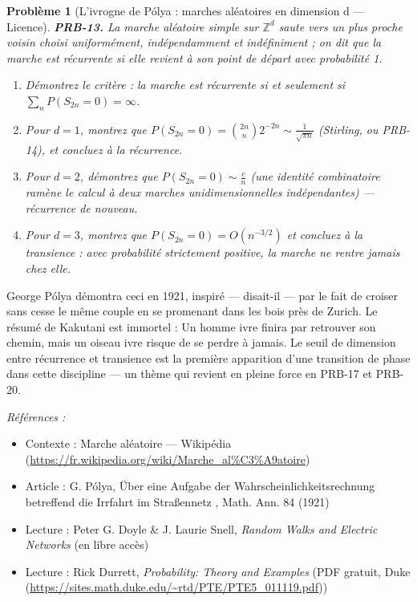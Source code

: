 \documentclass[11pt]{article}
\newtheorem{problem}{Problème}
\newenvironment{refs}{\par\small\noindent\emph{Références :}\begin{itemize}\setlength\itemsep{0pt}}{\end{itemize}\normalsize}
\begin{document}
\bigskip

\begin{problem}[{L'ivrogne de Pólya : marches aléatoires en dimension d --- Licence}]
\textbf{PRB-13.} La marche aléatoire simple sur $ \mathbb{Z}^d $ saute
vers un plus proche voisin choisi uniformément, indépendamment et indéfiniment ; on dit que la
marche est \textit{récurrente} si elle revient à son point de départ avec probabilité 1.
\begin{enumerate}
\item[(i)] Démontrez le critère : la marche est récurrente si et seulement si
$ \sum_n P(S_{2n} = 0) = \infty $.
\item[(ii)] Pour $ d=1 $, montrez que
$ P(S_{2n}=0) = \binom{2n}{n}2^{-2n} \sim \frac{1}{\sqrt{\pi n}} $ (Stirling, ou PRB-14), et
concluez à la récurrence.
\item[(iii)] Pour $ d=2 $, démontrez que $ P(S_{2n}=0) \sim \frac{c}{n} $ (une identité combinatoire
ramène le calcul à deux marches unidimensionnelles indépendantes) --- récurrence de nouveau.
\item[(iv)] Pour $ d=3 $, montrez que $ P(S_{2n}=0) = O(n^{-3/2}) $ et concluez à la transience : avec
probabilité strictement positive, la marche ne rentre jamais chez elle.
\end{enumerate}

\end{problem}

\noindent George Pólya démontra ceci en 1921, inspiré --- disait-il --- par le fait de croiser
sans cesse le même couple en se promenant dans les bois près de Zurich. Le résumé de Kakutani est
immortel : \og{} Un homme ivre finira par retrouver son chemin, mais un oiseau ivre risque de se
perdre à jamais. \fg{} Le seuil de dimension entre récurrence et transience est la première apparition
d'une transition de phase dans cette discipline --- un thème qui revient en pleine force en PRB-17
et PRB-20.

\begin{refs}
\item Contexte : Marche aléatoire --- Wikipédia (\url{https://fr.wikipedia.org/wiki/Marche_al%C3%A9atoire})
\item Article : G. Pólya, \og{} Über eine Aufgabe der Wahrscheinlichkeitsrechnung betreffend die Irrfahrt im Straßennetz \fg{}, Math. Ann. 84 (1921)
\item Lecture : Peter G. Doyle \& J. Laurie Snell, \textit{Random Walks and Electric Networks} (en libre accès)
\item Lecture : Rick Durrett, \textit{Probability: Theory and Examples} (PDF gratuit, Duke (\url{https://sites.math.duke.edu/~rtd/PTE/PTE5_011119.pdf}))
\end{refs}
\end{document}
